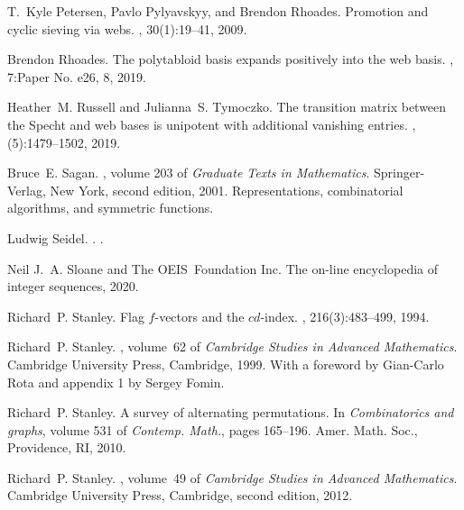\documentclass[reqno,12pt]{amsart}
\theoremstyle{definition}
\theoremstyle{remark}
\begin{document}
\begin{thebibliography}{Dum74}
  T.~Kyle Petersen, Pavlo Pylyavskyy, and Brendon Rhoades.
  \newblock Promotion and cyclic sieving via webs.
  , 30(1):19--41, 2009.
  
  Brendon Rhoades.
  \newblock The polytabloid basis expands positively into the web basis.
  , 7:Paper No. e26, 8, 2019.
  
  Heather~M. Russell and Julianna~S. Tymoczko.
  \newblock The transition matrix between the {S}pecht and web bases is unipotent
    with additional vanishing entries.
  , (5):1479--1502, 2019.
  
  Bruce~E. Sagan.
  , volume 203 of {\em Graduate Texts in
    Mathematics}.
  \newblock Springer-Verlag, New York, second edition, 2001.
  \newblock Representations, combinatorial algorithms, and symmetric functions.
  
  Ludwig Seidel.
  .
  .
  
  Neil J.~A. Sloane and The OEIS~Foundation Inc.
  \newblock The on-line encyclopedia of integer sequences, 2020.
  
  Richard~P. Stanley.
  \newblock Flag {$f$}-vectors and the {$cd$}-index.
  , 216(3):483--499, 1994.
  
  Richard~P. Stanley.
  , volume~62 of {\em
    Cambridge Studies in Advanced Mathematics}.
  \newblock Cambridge University Press, Cambridge, 1999.
  \newblock With a foreword by Gian-Carlo Rota and appendix 1 by Sergey Fomin.
  
  Richard~P. Stanley.
  \newblock A survey of alternating permutations.
  \newblock In {\em Combinatorics and graphs}, volume 531 of {\em Contemp.
    Math.}, pages 165--196. Amer. Math. Soc., Providence, RI, 2010.
  
  Richard~P. Stanley.
  , volume~49 of {\em
    Cambridge Studies in Advanced Mathematics}.
  \newblock Cambridge University Press, Cambridge, second edition, 2012.
  
\end{thebibliography}
  
\end{document}
